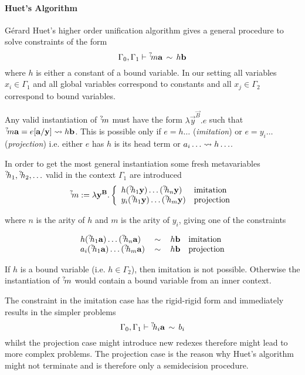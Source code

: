 \paragraph{Huet's Algorithm}
Gérard Huet's higher order unification algorithm gives a general procedure to
solve constraints of the form
$$
    \Gamma_0, \Gamma_1
    \vdash
    {{}^? \kern-0.2em m} {\mathbf a} \,\sim\, h {\mathbf b}
$$
where $h$ is either a constant of a bound variable. In our setting all variables
$x_i \in \Gamma_1$ and all global variables correspond to constants and all $x_j
\in \Gamma_2$ correspond to bound variables.

Any valid instantiation of ${{}^? \kern-0.2em m}$ must have the form $\lambda \vec y^{\vec
B}. e$ such that ${{}^? \kern-0.2em m} {\mathbf a} = e[{\mathbf a}/{\mathbf y}] \leadsto h {\mathbf b}$. This is
possible only if $e = h \ldots$ (\emph{imitation}) or $e = y_i \ldots$
(\emph{projection}) i.e. either $e$ has $h$ is its head term or $a_i \ldots
\leadsto h \ldots$.

In order to get the most general instantiation some fresh metavariables ${{}^? \kern-0.2em h}_1, {{}^? \kern-0.2em h}_2, \ldots$ valid in the context $\Gamma_1$ are introduced
$$
    {{}^? \kern-0.2em m}
    := \lambda {\mathbf y}^{{\mathbf B}}.
    \left\{ \begin{array}{lllll} 
        h ({{}^? \kern-0.2em h}_1 {\mathbf y}) \ldots ({{}^? \kern-0.2em h}_n {\mathbf y})
        & \text{imitation}
        \\
        y_i ({{}^? \kern-0.2em h}_1 {\mathbf y}) \ldots ({{}^? \kern-0.2em h}_m {\mathbf y})
        & \text{projection}
     \end{array} \right.
$$

where $n$ is the arity of $h$ and $m$ is the arity of $y_i$,
giving one of the constraints

$$
\begin{array}{lllll} 
    h ({{}^? \kern-0.2em h}_1 {\mathbf a}) \ldots ({{}^? \kern-0.2em h}_n {\mathbf a})
    &\,\sim\,&
    h {\mathbf b}
    & \text{imitation}
    \\
    a_i ({{}^? \kern-0.2em h}_1 {\mathbf a}) \ldots ({{}^? \kern-0.2em h}_m {\mathbf a})
    &\,\sim\,&
    h {\mathbf b}
    & \text{projection}
 \end{array}
$$

If $h$ is a bound variable (i.e. $h\in \Gamma_2$), then imitation is not
possible. Otherwise the instantiation of ${{}^? \kern-0.2em m}$ would contain a bound
variable from an inner context.

The constraint in the imitation case has the rigid-rigid form and immediately
results in the simpler problems
$$
    \Gamma_0, \Gamma_1 \vdash {{}^? \kern-0.2em h}_i {\mathbf a} \,\sim\, b_i
$$
whilst the projection case might introduce new redexes therefore might lead to
more complex problems. The projection case is the reason why Huet's algorithm
might not terminate and is therefore only a semidecision procedure.

